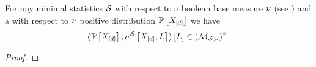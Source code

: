 \begin{theorem}
    \label{the:meanPolytopeInteriorCharacterization}
    For any minimal statistics $\mathcal{S}$ with respect to a boolean base measure $\nu$ (see ) and a with respect to $\nu$ positive distribution $\mathbb{P}\left[X_{[d]}\right]$ we have
    \begin{align*}
        \left\langle \mathbb{P}\left[X_{[d]}\right],\sigma^{\mathcal{S}}\left[X_{[d]},L\right]\right\rangle \left[ L \right] \in {\left(\mathcal{M}_{\mathcal{S},\nu}\right)}^{\circ} \, .
    \end{align*}
\end{theorem}
\begin{proof}


\end{proof}
